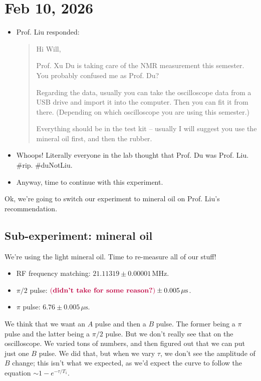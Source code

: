 \documentclass[11pt]{article}
\begin{document}
\section{Feb 10, 2026}

\begin{itemize}
    \item Prof. Liu responded:
    \begin{quote}
        Hi Will,

        Prof. Xu Du is taking care of the NMR measurement this semester. You
        probably confused me as Prof. Du?

        Regarding the data, usually you can take the oscilloscope data from a USB
        drive and import it into the computer. Then you can fit it from there.
        (Depending on which oscilloscope you are using this semester.)

        Everything should be in the test kit -- usually I will suggest you use the
        mineral oil first, and then the rubber.
    \end{quote}
    \item Whoops! Literally everyone in the lab thought that Prof. Du was Prof. Liu.
    \#rip. \#duNotLiu.
    \item Anyway, time to continue with this experiment.
\end{itemize}

Ok, we're going to switch our experiment to mineral oil on Prof. Liu's
recommendation.

\subsection{Sub-experiment: mineral oil}

We're using the light mineral oil. Time to re-measure all of our stuff!
\begin{itemize}
    \item RF frequency matching: $21.11319 \pm 0.00001 \, \mathrm{MHz}$.
    \item $\pi/2$ pulse: $\color{purple} (\textbf{didn't take for some reason?}) \color{black} \pm 0.005 \, \mu \mathrm{s}$.
    \item $\pi$ pulse: $6.76 \pm 0.005 \, \mu \mathrm{s}$.
\end{itemize}

We think that we want an $A$ pulse and then a $B$ pulse. The former being
a $\pi$ pulse and the latter being a $\pi/2$ pulse. But we don't really see
that on the oscilloscope. We varied tons of numbers, and then figured out that
we can put just one $B$ pulse. We did that, but when we vary $\tau$, we don't
see the amplitude of $B$ change; this isn't what we expected, as we'd expect the
curve to follow the equation $\sim 1 - e^{-\tau/T_1}$.\\
\end{document}
